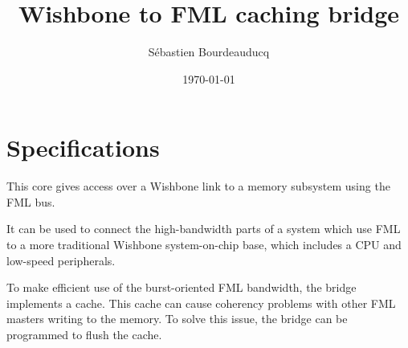 \documentclass[a4paper,11pt]{article}
\title{Wishbone to FML caching bridge}
\author{S\'ebastien Bourdeauducq}
\date{\today}
\begin{document}
\setlength{\parindent}{0pt}
\setlength{\parskip}{5pt}
\maketitle{}
\section{Specifications}
This core gives access over a Wishbone link to a memory subsystem using the FML bus.

It can be used to connect the high-bandwidth parts of a system which use FML to a more traditional Wishbone system-on-chip base, which includes a CPU and low-speed peripherals.

To make efficient use of the burst-oriented FML bandwidth, the bridge implements a cache. This cache can cause coherency problems with other FML masters writing to the memory. To solve this issue, the bridge can be programmed to flush the cache.
\end{document}
